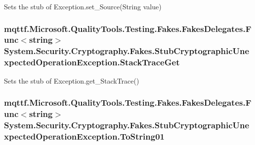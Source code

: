 Sets the stub of Exception.\-set\-\_\-\-Source(\-String value)

\hypertarget{class_system_1_1_security_1_1_cryptography_1_1_fakes_1_1_stub_cryptographic_unexpected_operation_exception_af27598bc224c35e7dcc5bc5ac6b2e8fa}{
\subsubsection[{Stack\-Trace\-Get}]{\setlength{\rightskip}{0pt plus 5cm}mqttf.\-Microsoft.\-Quality\-Tools.\-Testing.\-Fakes.\-Fakes\-Delegates.\-Func$<$string$>$ System.\-Security.\-Cryptography.\-Fakes.\-Stub\-Cryptographic\-Unexpected\-Operation\-Exception.\-Stack\-Trace\-Get}}\label{class_system_1_1_security_1_1_cryptography_1_1_fakes_1_1_stub_cryptographic_unexpected_operation_exception_af27598bc224c35e7dcc5bc5ac6b2e8fa}


Sets the stub of Exception.\-get\-\_\-\-Stack\-Trace()

\hypertarget{class_system_1_1_security_1_1_cryptography_1_1_fakes_1_1_stub_cryptographic_unexpected_operation_exception_a1765670cd36f1504d93ca40c6c9b90dd}{
\subsubsection[{To\-String01}]{\setlength{\rightskip}{0pt plus 5cm}mqttf.\-Microsoft.\-Quality\-Tools.\-Testing.\-Fakes.\-Fakes\-Delegates.\-Func$<$string$>$ System.\-Security.\-Cryptography.\-Fakes.\-Stub\-Cryptographic\-Unexpected\-Operation\-Exception.\-To\-String01}}\label{class_system_1_1_security_1_1_cryptography_1_1_fakes_1_1_stub_cryptographic_unexpected_operation_exception_a1765670cd36f1504d93ca40c6c9b90dd}


